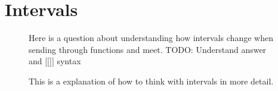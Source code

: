 \documentclass[a5paper]{article}
\begin{document}
\section*{Intervals}
\begin{figure}[ht]
	\centering
	\caption*{Here is a question about understanding how intervals change when sending through functions and meet. TODO: Understand answer and [[]] syntax
	}\label{fig:2017_1-1-1}
\end{figure}
\begin{figure}[ht]
	\centering
	\caption*{This is a explanation of how to think with intervals in more detail.
	}\label{fig:2017_1-1-1}
\end{figure}
\end{document}
